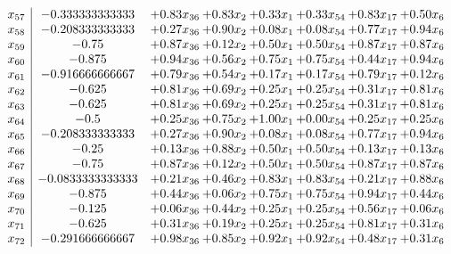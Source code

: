 \documentclass[8pt]{article}
\begin{document}
\[\begin{array}{c| c c@{\hskip 2pt} c@{\hskip 2pt} c@{\hskip 2pt} c@{\hskip 2pt} c@{\hskip 2pt} c@{\hskip 2pt} }
 x_{57}   &  -0.333333333333 & +  0.83 x_{36} & +  0.83 x_{2} & +  0.33 x_{1} & +  0.33 x_{54} & +  0.83 x_{17} & +  0.50 x_{6}\\
 x_{58}   &  -0.208333333333 & +  0.27 x_{36} & +  0.90 x_{2} & +  0.08 x_{1} & +  0.08 x_{54} & +  0.77 x_{17} & +  0.94 x_{6}\\
 x_{59}   &  -0.75 & +  0.87 x_{36} & +  0.12 x_{2} & +  0.50 x_{1} & +  0.50 x_{54} & +  0.87 x_{17} & +  0.87 x_{6}\\
 x_{60}   &  -0.875 & +  0.94 x_{36} & +  0.56 x_{2} & +  0.75 x_{1} & +  0.75 x_{54} & +  0.44 x_{17} & +  0.94 x_{6}\\
 x_{61}   &  -0.916666666667 & +  0.79 x_{36} & +  0.54 x_{2} & +  0.17 x_{1} & +  0.17 x_{54} & +  0.79 x_{17} & +  0.12 x_{6}\\
 x_{62}   &  -0.625 & +  0.81 x_{36} & +  0.69 x_{2} & +  0.25 x_{1} & +  0.25 x_{54} & +  0.31 x_{17} & +  0.81 x_{6}\\
 x_{63}   &  -0.625 & +  0.81 x_{36} & +  0.69 x_{2} & +  0.25 x_{1} & +  0.25 x_{54} & +  0.31 x_{17} & +  0.81 x_{6}\\
 x_{64}   &  -0.5 & +  0.25 x_{36} & +  0.75 x_{2} & +  1.00 x_{1} & +  0.00 x_{54} & +  0.25 x_{17} & +  0.25 x_{6}\\
 x_{65}   &  -0.208333333333 & +  0.27 x_{36} & +  0.90 x_{2} & +  0.08 x_{1} & +  0.08 x_{54} & +  0.77 x_{17} & +  0.94 x_{6}\\
 x_{66}   &  -0.25 & +  0.13 x_{36} & +  0.88 x_{2} & +  0.50 x_{1} & +  0.50 x_{54} & +  0.13 x_{17} & +  0.13 x_{6}\\
 x_{67}   &  -0.75 & +  0.87 x_{36} & +  0.12 x_{2} & +  0.50 x_{1} & +  0.50 x_{54} & +  0.87 x_{17} & +  0.87 x_{6}\\
 x_{68}   &  -0.0833333333333 & +  0.21 x_{36} & +  0.46 x_{2} & +  0.83 x_{1} & +  0.83 x_{54} & +  0.21 x_{17} & +  0.88 x_{6}\\
 x_{69}   &  -0.875 & +  0.44 x_{36} & +  0.06 x_{2} & +  0.75 x_{1} & +  0.75 x_{54} & +  0.94 x_{17} & +  0.44 x_{6}\\
 x_{70}   &  -0.125 & +  0.06 x_{36} & +  0.44 x_{2} & +  0.25 x_{1} & +  0.25 x_{54} & +  0.56 x_{17} & +  0.06 x_{6}\\
 x_{71}   &  -0.625 & +  0.31 x_{36} & +  0.19 x_{2} & +  0.25 x_{1} & +  0.25 x_{54} & +  0.81 x_{17} & +  0.31 x_{6}\\
 x_{72}   &  -0.291666666667 & +  0.98 x_{36} & +  0.85 x_{2} & +  0.92 x_{1} & +  0.92 x_{54} & +  0.48 x_{17} & +  0.31 x_{6}\\

\end{array}\]
\end{document}
